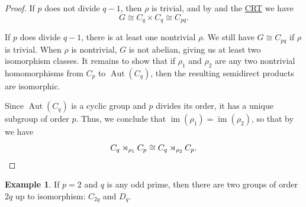 \documentclass[12pt]{report}
\numberwithin{equation}{section}
\numberwithin{theorem}{chapter}
\theoremstyle{definition}
\newtheorem{example}[theorem]{Example}
\newtheorem*{basic properties}{Basic Properties}
\newtheorem*{Important Remark}{Important Remark}
\newcommand{\Z}{\mathbb{Z}}
\def\sdp{\rtimes}
\DeclareMathOperator{\im}{im}
\DeclareMathOperator{\Aut}{Aut}
\begin{document}
\begin{proof}
If $p$ does not divide $q-1$, then $\rho$ is trivial, and by  and the \hyperref[CRT]{CRT} we have 
$$G \cong C_q \times C_q \cong C_{pq}.$$

If $p$ does divide $q-1$, there is at least one nontrivial $\rho$.
We still have $G \cong C_{pq}$ if $\rho$ is trivial. When $\rho$ is nontrivial, $G$ is not abelian, giving us at least two isomorphism classes. 
It remains to show that if $\rho_1$ and $\rho_2$ are any two nontrivial homomorphisms from $C_p$ to $\Aut(C_q)$, then the resulting semidirect products are isomorphic.

Since $\Aut(C_q)$ is a cyclic group and $p$ divides its order, it has a unique subgroup of order $p$.
Thus, we conclude that $\im(\rho_1) = \im(\rho_2)$, so that by  we have
$$C_q \sdp_{\rho_1} C_p \cong C_q \sdp_{\rho_2} C_p.\qedhere$$
\end{proof}




\begin{example} 
	If $p =2$ and $q$ is any odd prime, then there are two groups of order $2q$ up to isomorphism: $C_{2q}$ and $D_{q}$.
\end{example}

\end{document}
